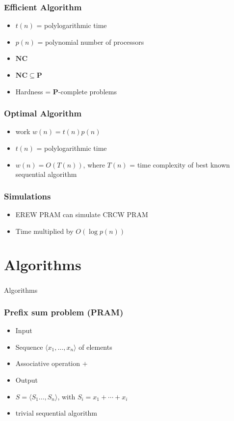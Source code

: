 \documentclass[14pt,aspectratio=169]{beamer}
\begin{document}
\begin{frame}\frametitle{Efficient Algorithm}
\begin{itemize}
\item
  $t(n)$ = polylogarithmic time
\item
  $p(n)$ = polynomial number of processors
\item
  $\mathbf{NC}$
\item
  $\mathbf{NC}\subseteq \mathbf{P}$
\item
  Hardness = $\mathbf{P}$-complete problems
\end{itemize}
\end{frame}


\begin{frame}\frametitle{Optimal Algorithm}
\begin{itemize}
\item
  \alert{work} $w(n) = t(n) p(n)$
\item
  $t(n)$ = polylogarithmic time
\item
  $w(n) = O(T(n))$, where $T(n)$ = time complexity of \alert{best known}
  sequential algorithm
\end{itemize}
\end{frame}


\begin{frame}\frametitle{Simulations}
\begin{itemize}
\item
  EREW PRAM can simulate CRCW PRAM
\item
  Time multiplied by $O(\log p(n))$
\end{itemize}
\end{frame}




\section{Algorithms}


\begin{frame}\frametitle{}
  \begin{center}
    \Huge
    Algorithms
  \end{center}
\end{frame}

\begin{frame}\frametitle{Prefix sum problem (PRAM)}
  \begin{itemize}
  \item
    Input
  \item
    Sequence $\langle x_{1}, \ldots , x_{n} \rangle$ of elements
  \item
    Associative operation $+$
  \item
    Output
  \item
     $S=\langle S_{1}  \ldots , S_{n} \rangle$, with $S_{i} = x_{1} +
     \cdots + x_{i}$
   \item
     trivial sequential algorithm
  \end{itemize}
\end{frame}
\end{document}
